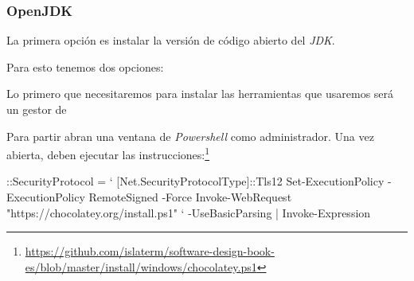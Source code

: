 \subsubsection{OpenJDK}
  La primera opción es instalar la versión de código abierto del \textit{JDK}.

  Para esto tenemos dos opciones:
  \begin{defaultbox}
    Lo primero que necesitaremos para instalar las herramientas que usaremos será un gestor de 
  
    Para partir abran una ventana de \textit{Powershell} como administrador.
    Una vez abierta, deben ejecutar las instrucciones:\footnote{
      \url{https://github.com/islaterm/software-design-book-es/blob/master/install/windows/chocolatey.ps1}
    }
    \begin{powershell}
      ::SecurityProtocol = `
        [Net.SecurityProtocolType]::Tls12
      Set-ExecutionPolicy -ExecutionPolicy RemoteSigned -Force
      Invoke-WebRequest "https://chocolatey.org/install.ps1" `
        -UseBasicParsing | Invoke-Expression
    \end{powershell}
  
  
    
    
  \end{defaultbox}
